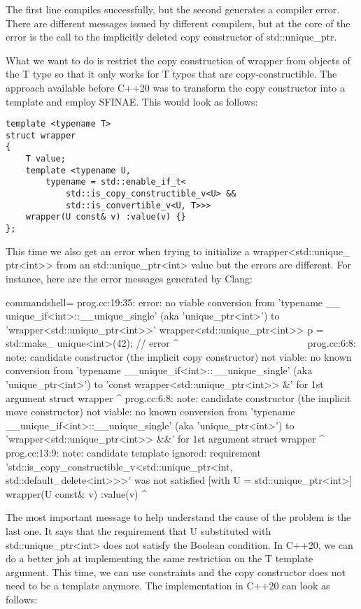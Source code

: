 The first line compiles successfully, but the second generates a compiler error. There are different messages issued by different compilers, but at the core of the error is the call to the implicitly deleted copy constructor of std::unique\_ptr.

What we want to do is restrict the copy construction of wrapper from objects of the T type so that it only works for T types that are copy-constructible. The approach available before C++20 was to transform the copy constructor into a template and employ SFINAE. This would look as follows:

\begin{lstlisting}[style=styleCXX]
template <typename T>
struct wrapper
{
	T value;
	template <typename U,
		typename = std::enable_if_t<
			std::is_copy_constructible_v<U> &&
			std::is_convertible_v<U, T>>>
	wrapper(U const& v) :value(v) {}
};
\end{lstlisting}

This time we also get an error when trying to initialize a wrapper<std::unique\_ ptr<int>> from an std::unique\_ptr<int> value but the errors are different. For instance, here are the error messages generated by Clang:

\begin{tcblisting}{commandshell={}}
prog.cc:19:35: error: no viable conversion from 'typename __
unique_if<int>::__unique_single' (aka 'unique_ptr<int>') to
   'wrapper<std::unique_ptr<int>>'
wrapper<std::unique_ptr<int>> p = std::make_
unique<int>(42); // error
                                        ^ ~~~~~~~~~~~~~~~~~~~~~~~~~
prog.cc:6:8: note: candidate constructor (the implicit copy
constructor) not viable: no known conversion from 'typename
__unique_if<int>::__unique_single' (aka 'unique_ptr<int>') to
'const wrapper<std::unique_ptr<int>> &' for 1st argument
struct wrapper
         ^
prog.cc:6:8: note: candidate constructor (the implicit move
constructor) not viable: no known conversion from 'typename
__unique_if<int>::__unique_single' (aka 'unique_ptr<int>') to
'wrapper<std::unique_ptr<int>> &&' for 1st argument
struct wrapper
         ^
prog.cc:13:9: note: candidate template ignored: requirement
'std::is_copy_constructible_v<std::unique_ptr<int,
std::default_delete<int>>>' was not satisfied [with U =
std::unique_ptr<int>]
        wrapper(U const& v) :value(v) {}
        ^
\end{tcblisting}

The most important message to help understand the cause of the problem is the last one. It says that the requirement that U substituted with std::unique\_ptr<int> does not satisfy the Boolean condition. In C++20, we can do a better job at implementing the same restriction on the T template argument. This time, we can use constraints and the copy constructor does not need to be a template anymore. The implementation in C++20 can look as follows:

